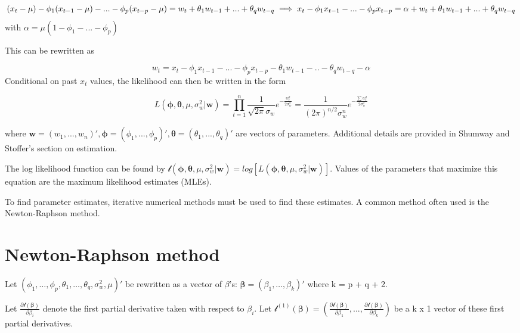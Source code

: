\documentclass[
]{book}
\theoremstyle{definition}
\theoremstyle{definition}
\theoremstyle{definition}
\theoremstyle{definition}
\theoremstyle{remark}
\begin{document}
\[(x_t-\mu)-\phi_1(x_{t-1}-\mu)-...-\phi_p(x_{t-p}-\mu)=\\
w_t+\theta_1w_{t-1}+...+\theta_qw_{t-q}\\
\implies x_t-\phi_1x_{t-1}-...-\phi_px_{t-p}=\alpha+w_t+\theta_1w_{t-1}+...+\theta_qw_{t-q}\] with \(\alpha=\mu(1-\phi_1-...-\phi_p)\)

This can be rewritten as

\[w_t=x_t-\phi_1x_{t-1}-...-\phi_px_{t-p}-\theta_1w_{t-1}-..-\theta_qw_{t-q}-\alpha\]
Conditional on past \(x_t\) values, the likelihood can then be written in the form

\[L(\boldsymbol \phi,\boldsymbol \theta, \mu, \sigma_w^2|\boldsymbol w)=\prod_{t=1}^{n}\frac{1}{\sqrt{2\pi}\sigma_w}e^{-\frac{w_t^2}{2\sigma_w^2}}=\frac{1}{(2\pi)^{n/2}\sigma_w^n}e^{-\frac{\sum w_t^2}{2\sigma_w^2}}\]

where \(\boldsymbol w=(w_1,...,w_n)', \boldsymbol \phi=(\phi_1,...,\phi_p)', \boldsymbol \theta=(\theta_1,...,\theta_q)'\) are vectors of parameters. Additional details are provided in Shumway and Stoffer's section on estimation.

The log likelihood function can be found by \(\mathcal l(\boldsymbol \phi,\boldsymbol \theta,\mu,\sigma_w^2 |\boldsymbol w) = log[L(\boldsymbol \phi,\boldsymbol \theta, \mu, \sigma_w^2|\boldsymbol w)]\). Values of the parameters that maximize this equation are the maximum likelihood estimates (MLEs).

To find parameter estimates, iterative numerical methods must be used to find these estimates. A common method often used is the Newton-Raphson method.

\hypertarget{newton-raphson-method}{%
\section{Newton-Raphson method}\label{newton-raphson-method}}

Let \((\phi_1, …, \phi_p, \theta_1, …, \theta_q,\sigma_w^2,\mu)'\) be rewritten as a vector of \(\beta\)'s: \(\boldsymbol \beta= (\beta_1,…,\beta_k)'\) where k = p + q + 2.

Let \(\frac{\partial \mathcal l(\boldsymbol \beta) }{\partial \beta_i}\) denote the first partial derivative taken with respect to \(\beta_i\). Let \(\mathcal l^{(1)}(\boldsymbol \beta)= (\frac{\partial \mathcal l(\boldsymbol \beta) }{\partial \beta_1},..., \frac{\partial \mathcal l(\boldsymbol \beta) }{\partial \beta_k})\) be a k x 1 vector of these first partial derivatives.
\end{document}
